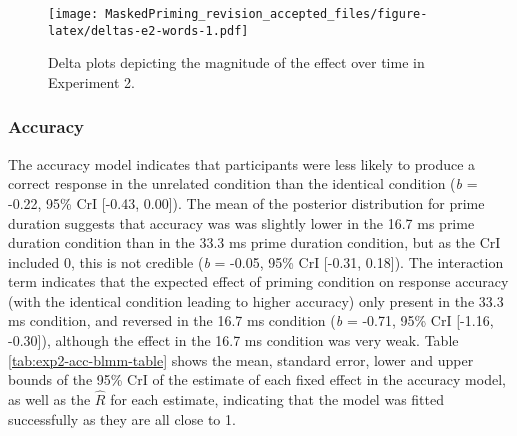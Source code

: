 \documentclass[
  english,
  man,floatsintext]{apa6}
\begin{document}
\begin{figure}
\centering
\texttt{[image: MaskedPriming\_revision\_accepted\_files/figure-latex/deltas-e2-words-1.pdf]}
\caption{\label{fig:deltas-e2-words}Delta plots depicting the magnitude of the effect over time in Experiment 2.}
\end{figure}

\hypertarget{accuracy-1}{%
\subsubsection{Accuracy}\label{accuracy-1}}

The accuracy model indicates that participants were less likely to produce a correct response in the unrelated condition than the identical condition (\emph{b} = -0.22, 95\% CrI {[}-0.43, 0.00{]}). The mean of the posterior distribution for prime duration suggests that accuracy was was slightly lower in the 16.7 ms prime duration condition than in the 33.3 ms prime duration condition, but as the CrI included 0, this is not credible (\emph{b} = -0.05, 95\% CrI {[}-0.31, 0.18{]}). The interaction term indicates that the expected effect of priming condition on response accuracy (with the identical condition leading to higher accuracy) only present in the 33.3 ms condition, and reversed in the 16.7 ms condition (\emph{b} = -0.71, 95\% CrI {[}-1.16, -0.30{]}), although the effect in the 16.7 ms condition was very weak. Table \ref{tab:exp2-acc-blmm-table} shows the mean, standard error, lower and upper bounds of the 95\% CrI of the estimate of each fixed effect in the accuracy model, as well as the \(\hat{R}\) for each estimate, indicating that the model was fitted successfully as they are all close to 1.
\end{document}
